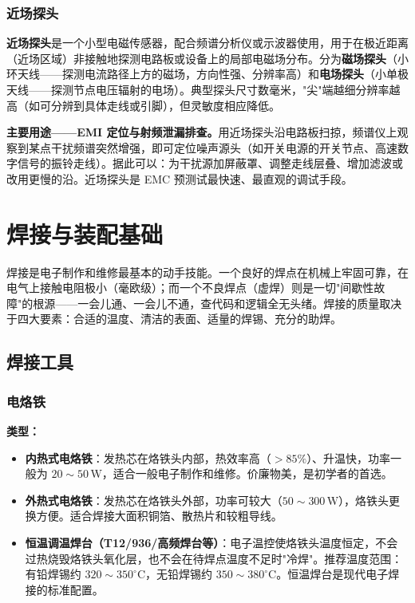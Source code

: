 \documentclass[12pt,UTF8]{ctexbook}
\begin{document}
\subsection{近场探头}

\textbf{近场探头}是一个小型电磁传感器，配合频谱分析仪或示波器使用，用于在极近距离（近场区域）非接触地探测电路板或设备上的局部电磁场分布。分为\textbf{磁场探头}（小环天线——探测电流路径上方的磁场，方向性强、分辨率高）和\textbf{电场探头}（小单极天线——探测节点电压辐射的电场）。典型探头尺寸数毫米，"尖"端越细分辨率越高（如可分辨到具体走线或引脚），但灵敏度相应降低。

\textbf{主要用途——EMI 定位与射频泄漏排查。}用近场探头沿电路板扫掠，频谱仪上观察到某点干扰频谱突然增强，即可定位噪声源头（如开关电源的开关节点、高速数字信号的振铃走线）。据此可以：为干扰源加屏蔽罩、调整走线层叠、增加滤波或改用更慢的沿。近场探头是 EMC 预测试最快速、最直观的调试手段。

\chapter{焊接与装配基础}
\label{chap:soldering_basics}

焊接是电子制作和维修最基本的动手技能。一个良好的焊点在机械上牢固可靠，在电气上接触电阻极小（毫欧级）；而一个不良焊点（虚焊）则是一切"间歇性故障"的根源——一会儿通、一会儿不通，查代码和逻辑全无头绪。焊接的质量取决于四大要素：合适的温度、清洁的表面、适量的焊锡、充分的助焊。

\section{焊接工具}
\label{sec:soldering_tools}

\subsection{电烙铁}

\textbf{类型：}
\begin{itemize}
  \item \textbf{内热式电烙铁}：发热芯在烙铁头内部，热效率高（$>85\%$）、升温快，功率一般为 $20\sim50\,\mathrm{W}$，适合一般电子制作和维修。价廉物美，是初学者的首选。
  \item \textbf{外热式电烙铁}：发热芯在烙铁头外部，功率可较大（$50\sim300\,\mathrm{W}$），烙铁头更换方便。适合焊接大面积铜箔、散热片和较粗导线。
  \item \textbf{恒温调温焊台（T12/936/高频焊台等）}：电子温控使烙铁头温度恒定，不会过热烧毁烙铁头氧化层，也不会在待焊点温度不足时"冷焊"。推荐温度范围：有铅焊锡约 $320\sim350^\circ\mathrm{C}$，无铅焊锡约 $350\sim380^\circ\mathrm{C}$。恒温焊台是现代电子焊接的标准配置。
\end{itemize}
\end{document}
